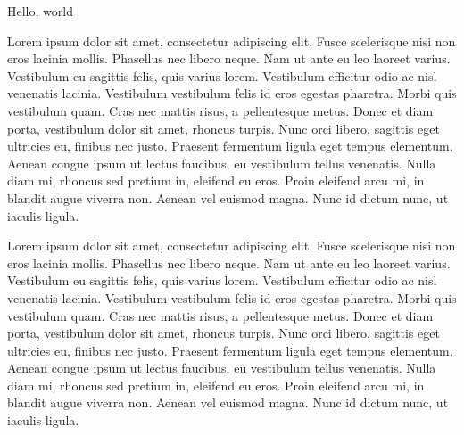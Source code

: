 \documentclass{article}
\newenvironment{Narrator}
               {\begin{tcolorbox}[enhanced,
                     breakable,
                     parbox=false,
                     colback=narrator-bg,
                     colframe=narrator-frame,
                     attach boxed title to top left={xshift=5mm,
                       yshift=-3mm,
                       yshifttext=-1mm},
                     coltitle=black,
                     colbacktitle=narrator-title-bg,
                     title=Narrator,
                     boxed title style={size=small,
                       colframe=black},
                     title after break={Title}]}
               {\end{tcolorbox}}
\begin{document}
\begin{Narrator}
  
Hello, world

Lorem ipsum dolor sit amet, consectetur adipiscing elit. Fusce scelerisque nisi non eros lacinia mollis. Phasellus nec libero neque. Nam ut ante eu leo laoreet varius. Vestibulum eu sagittis felis, quis varius lorem. Vestibulum efficitur odio ac nisl venenatis lacinia. Vestibulum vestibulum felis id eros egestas pharetra. Morbi quis vestibulum quam. Cras nec mattis risus, a pellentesque metus. Donec et diam porta, vestibulum dolor sit amet, rhoncus turpis. Nunc orci libero, sagittis eget ultricies eu, finibus nec justo. Praesent fermentum ligula eget tempus elementum. Aenean congue ipsum ut lectus faucibus, eu vestibulum tellus venenatis. Nulla diam mi, rhoncus sed pretium in, eleifend eu eros. Proin eleifend arcu mi, in blandit augue viverra non. Aenean vel euismod magna. Nunc id dictum nunc, ut iaculis ligula.

Lorem ipsum dolor sit amet, consectetur adipiscing elit. Fusce scelerisque nisi non eros lacinia mollis. Phasellus nec libero neque. Nam ut ante eu leo laoreet varius. Vestibulum eu sagittis felis, quis varius lorem. Vestibulum efficitur odio ac nisl venenatis lacinia. Vestibulum vestibulum felis id eros egestas pharetra. Morbi quis vestibulum quam. Cras nec mattis risus, a pellentesque metus. Donec et diam porta, vestibulum dolor sit amet, rhoncus turpis. Nunc orci libero, sagittis eget ultricies eu, finibus nec justo. Praesent fermentum ligula eget tempus elementum. Aenean congue ipsum ut lectus faucibus, eu vestibulum tellus venenatis. Nulla diam mi, rhoncus sed pretium in, eleifend eu eros. Proin eleifend arcu mi, in blandit augue viverra non. Aenean vel euismod magna. Nunc id dictum nunc, ut iaculis ligula.

\end{Narrator}
\end{document}
